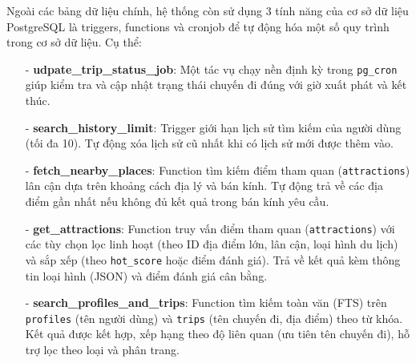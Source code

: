 Ngoài các bảng dữ liệu chính, hệ thống còn sử dụng 3 tính năng của cơ sở dữ liệu PostgreSQL là triggers, functions và cronjob để tự động hóa một số quy trình trong cơ sở dữ liệu. Cụ thể:
\begin{itemize}
    \item[-]\textbf{udpate\_trip\_status\_job}: Một tác vụ chạy nền định kỳ trong \texttt{pg\_cron} giúp kiểm tra và cập nhật trạng thái chuyến đi đúng với giờ xuất phát và kết thúc.
    
    \item[-]\textbf{search\_history\_limit}: Trigger giới hạn lịch sử tìm kiếm của người dùng (tối đa 10). Tự động xóa lịch sử cũ nhất khi có lịch sử mới được thêm vào.
    \item[-]\textbf{fetch\_nearby\_places}: Function tìm kiếm điểm tham quan (\texttt{attractions}) lân cận dựa trên khoảng cách địa lý và bán kính. Tự động trả về các địa điểm gần nhất nếu không đủ kết quả trong bán kính yêu cầu.
    \item[-]\textbf{get\_attractions}: Function truy vấn điểm tham quan (\texttt{attractions}) với các tùy chọn lọc linh hoạt (theo ID địa điểm lớn, lân cận, loại hình du lịch) và sắp xếp (theo \texttt{hot\_score} hoặc điểm đánh giá). Trả về kết quả kèm thông tin loại hình (JSON) và điểm đánh giá cân bằng.
    
    \item[-]\textbf{search\_profiles\_and\_trips}: Function tìm kiếm toàn văn (FTS) trên \texttt{profiles} (tên người dùng) và \texttt{trips} (tên chuyến đi, địa điểm) theo từ khóa. Kết quả được kết hợp, xếp hạng theo độ liên quan (ưu tiên tên chuyến đi), hỗ trợ lọc theo loại và phân trang.
\end{itemize}

